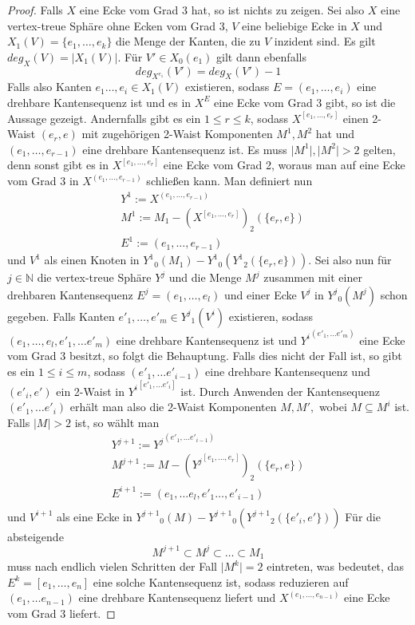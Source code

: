 \documentclass[12pt,titlepage,twoside,cleardoublepage]{article}
\theoremstyle{nummermitklammern}
\numberwithin{equation}{section}
\begin{document}
\begin{proof} 

Falls $X$ eine Ecke vom Grad 3 hat, so ist nichts zu zeigen. Sei also $X$ eine vertex-treue Sphäre ohne Ecken vom Grad 3, $V$ eine beliebige Ecke in $X$ und $X_1(V)=\{e_1,\ldots,e_k\}$ die Menge der Kanten, die zu $V$ inzident sind.
Es gilt $deg_X(V)=\vert X_1(V) \vert.$ Für $V'\in X_0(e_1)$ gilt dann ebenfalls
\[
deg_{X^{e_1}}(V')=deg_{X}(V')-1
\]
 Falls also Kanten $e_1\ldots, e_i \in X_1(V)$ existieren, sodass $E=(e_1,\ldots,e_i)$ eine drehbare Kantensequenz ist und es in $X^E$ eine Ecke vom Grad 3 gibt, so ist die Aussage gezeigt. Andernfalls gibt es ein $1\leq r \leq k$, sodass $X^{[e_1,\ldots ,e_r]}$ einen 2-Waist $(e_r,e)$ mit zugehörigen 2-Waist Komponenten $M^1,M^2$ hat und $(e_1,\ldots, e_{r-1})$ eine drehbare  Kantensequenz ist. Es muss $\vert M^1 \vert,\vert M^2 \vert >2$ gelten, denn sonst gibt es in $X^{[e_1,\ldots,e_{r}]}$ eine Ecke vom Grad 2, woraus man auf eine Ecke vom Grad 3 in $X^{(e_1,\ldots,e_{r-1})}$ schließen kann.
Man definiert nun 
\begin{align*}
&Y^1:=X^{(e_1,\ldots,e_{r-1})}\\
&M^1:=M_1 - {({X}^{[e_1,\ldots,e_r]})}_2(\{e_r,e\})\\
&E^1:=(e_1,\ldots,e_{r-1})
\end{align*}
und $V^1$ als einen Knoten in ${Y^1}_0(M_1)-{Y^1}_0({Y^1}_2(\{e_r,e\})).$
 Sei also nun für $j\in \mathbb{N}$ die vertex-treue Sphäre $Y^j$ und die Menge $M^j$ zusammen mit einer drehbaren Kantensequenz $E^j=(e_1,\ldots, e_l)$ und einer Ecke $V^j$ in ${Y^j}_0(M^j)$ schon gegeben. 
Falls Kanten $e'_1,\ldots,e'_m\in {Y^j}_1(V^i)$ existieren,
 sodass $(e_1,\ldots ,e_l,e'_1,\ldots e'_m)$ eine drehbare Kantensequenz ist und ${Y^i}^{(e'_1,\ldots e'_m)}$
  eine Ecke vom Grad 3 besitzt, so folgt die Behauptung. Falls dies nicht der Fall ist, so gibt es ein $1\leq i \leq m$, sodass $(e'_1,\ldots e'_{i-1})$ eine drehbare Kantensequenz und $(e'_{i},e')$ ein 2-Waist in ${Y^i}^{[e'_1,\ldots e'_{i}]}$ ist. Durch Anwenden der Kantensequenz $(e'_1,\ldots e'_{i})$ erhält man also die 2-Waist Komponenten $M,M',$ wobei $M \subseteq M^i$ ist. Falls $\vert M \vert >2$ ist, so wählt man
  \begin{align*}
  Y^{j+1}:={Y^j}^{(e'_1,\ldots e'_{i-1})}\\
  M^{j+1}:=M-{({Y^j}^{[e_1,\ldots, e_r]})}_2(\{e_r,e\})\\
  E^{i+1}:=(e_1,\ldots e_l,e'_1 \ldots, e'_{i-1})\\
\end{align*}   
und $V^{i+1}$ als eine Ecke in ${Y^{j+1}}_0(M)-{Y^{j+1}}_0({Y^{j+1}}_2(\{e'_i,e'\}))$ Für die absteigende 
\[
M^{j+1}\subset M^j\subset \ldots \subset M_1 
\]
muss nach endlich vielen Schritten der Fall $\vert M^k \vert=2$ eintreten, was bedeutet, das $E^{k}=[e_1,\ldots ,e_{n}]$ eine solche Kantensequenz ist, sodass reduzieren auf $(e_1, \ldots e_{n-1})$ eine drehbare Kantensequenz liefert und $X^{(e_1,\ldots,e_{n-1})}$ eine Ecke vom Grad 3 liefert.  
\end{proof}
\end{document}
